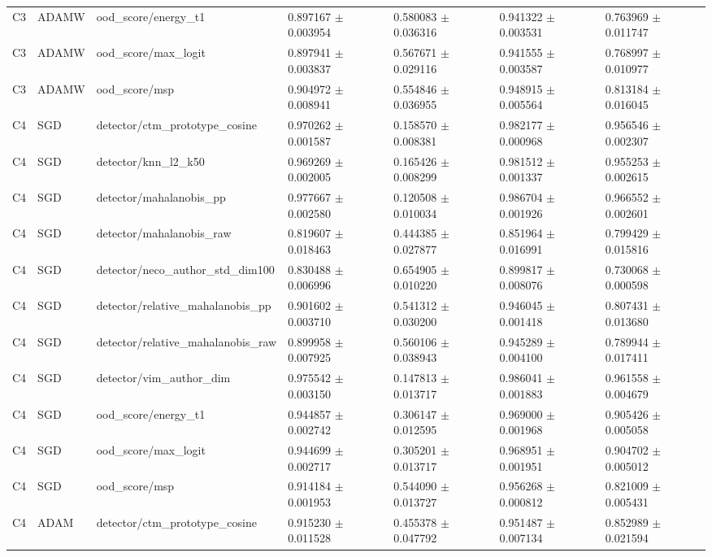 \begin{longtable}{lllllll}
C3 & ADAMW & ood\_score/energy\_t1 & 0.897167 $\pm$ 0.003954 & 0.580083 $\pm$ 0.036316 & 0.941322 $\pm$ 0.003531 & 0.763969 $\pm$ 0.011747 \\
C3 & ADAMW & ood\_score/max\_logit & 0.897941 $\pm$ 0.003837 & 0.567671 $\pm$ 0.029116 & 0.941555 $\pm$ 0.003587 & 0.768997 $\pm$ 0.010977 \\
C3 & ADAMW & ood\_score/msp & 0.904972 $\pm$ 0.008941 & 0.554846 $\pm$ 0.036955 & 0.948915 $\pm$ 0.005564 & 0.813184 $\pm$ 0.016045 \\
C4 & SGD & detector/ctm\_prototype\_cosine & 0.970262 $\pm$ 0.001587 & 0.158570 $\pm$ 0.008381 & 0.982177 $\pm$ 0.000968 & 0.956546 $\pm$ 0.002307 \\
C4 & SGD & detector/knn\_l2\_k50 & 0.969269 $\pm$ 0.002005 & 0.165426 $\pm$ 0.008299 & 0.981512 $\pm$ 0.001337 & 0.955253 $\pm$ 0.002615 \\
C4 & SGD & detector/mahalanobis\_pp & 0.977667 $\pm$ 0.002580 & 0.120508 $\pm$ 0.010034 & 0.986704 $\pm$ 0.001926 & 0.966552 $\pm$ 0.002601 \\
C4 & SGD & detector/mahalanobis\_raw & 0.819607 $\pm$ 0.018463 & 0.444385 $\pm$ 0.027877 & 0.851964 $\pm$ 0.016991 & 0.799429 $\pm$ 0.015816 \\
C4 & SGD & detector/neco\_author\_std\_dim100 & 0.830488 $\pm$ 0.006996 & 0.654905 $\pm$ 0.010220 & 0.899817 $\pm$ 0.008076 & 0.730068 $\pm$ 0.000598 \\
C4 & SGD & detector/relative\_mahalanobis\_pp & 0.901602 $\pm$ 0.003710 & 0.541312 $\pm$ 0.030200 & 0.946045 $\pm$ 0.001418 & 0.807431 $\pm$ 0.013680 \\
C4 & SGD & detector/relative\_mahalanobis\_raw & 0.899958 $\pm$ 0.007925 & 0.560106 $\pm$ 0.038943 & 0.945289 $\pm$ 0.004100 & 0.789944 $\pm$ 0.017411 \\
C4 & SGD & detector/vim\_author\_dim & 0.975542 $\pm$ 0.003150 & 0.147813 $\pm$ 0.013717 & 0.986041 $\pm$ 0.001883 & 0.961558 $\pm$ 0.004679 \\
C4 & SGD & ood\_score/energy\_t1 & 0.944857 $\pm$ 0.002742 & 0.306147 $\pm$ 0.012595 & 0.969000 $\pm$ 0.001968 & 0.905426 $\pm$ 0.005058 \\
C4 & SGD & ood\_score/max\_logit & 0.944699 $\pm$ 0.002717 & 0.305201 $\pm$ 0.013717 & 0.968951 $\pm$ 0.001951 & 0.904702 $\pm$ 0.005012 \\
C4 & SGD & ood\_score/msp & 0.914184 $\pm$ 0.001953 & 0.544090 $\pm$ 0.013727 & 0.956268 $\pm$ 0.000812 & 0.821009 $\pm$ 0.005431 \\
C4 & ADAM & detector/ctm\_prototype\_cosine & 0.915230 $\pm$ 0.011528 & 0.455378 $\pm$ 0.047792 & 0.951487 $\pm$ 0.007134 & 0.852989 $\pm$ 0.021594 \\

\end{longtable}
